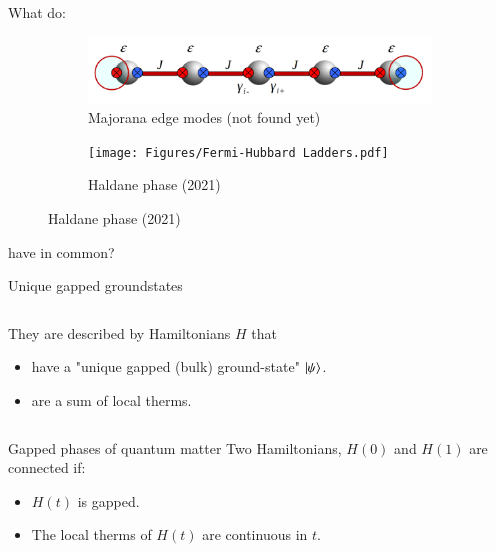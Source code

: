 \documentclass{beamer}
\begin{document}
\begin{frame}
	What do:
	\begin{figure}
		\centering
		\begin{subfigure}[b]{0.4\textwidth}
			\centering
			\includegraphics[width=\textwidth]{Figures/MajoranaEdgeModes.png}
			\caption{Majorana edge modes (not found yet)}
		\end{subfigure}
		\hfill
		\begin{subfigure}[b]{0.4\textwidth}
			\centering
			\texttt{[image: Figures/Fermi-Hubbard Ladders.pdf]}
			\caption{Haldane phase (2021)}
		\end{subfigure}
	\end{figure}
	have in common?
\end{frame}

\begin{frame}{Unique gapped groundstates}
	\begin{columns}
		\begin{column}{0.7\textwidth}
			They are described by Hamiltonians $H$ that
			\begin{itemize}
				\item<2-> have a "unique gapped (bulk) ground-state" $\ket{\psi}$.
				\item<3-> are a sum of local therms.
			\end{itemize}
		\end{column}
		\begin{column}{0.3\textwidth}
			\begin{center}
				
			\end{center}
		\end{column}
	\end{columns}
	
\end{frame}

\begin{frame}{Gapped phases of quantum matter}
	Two Hamiltonians, $H(0)$ and $H(1)$ are connected if:
	\begin{center}
	\end{center}
	\begin{itemize}
		\item<2-> $H(t)$ is gapped.
		\item<3-> The local therms of $H(t)$ are continuous in $t$.
	\end{itemize}
	
\end{frame}
\end{document}
